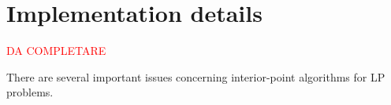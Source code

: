 \documentclass[a4paper,10 pt,titlepage,twoside]{book}
\theoremstyle{plain}
\theoremstyle{definition}
\theoremstyle{remark}
\begin{document}

\chapter{Implementation details}
\begin{center}
\textcolor{red}{DA COMPLETARE}	
\end{center}
There are several important issues concerning interior-point algorithms
for LP problems.
\end{document}
